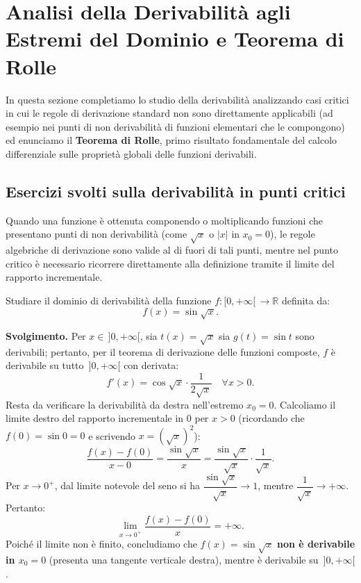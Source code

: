 \section{Analisi della Derivabilità agli Estremi del Dominio e Teorema di Rolle}

In questa sezione completiamo lo studio della derivabilità analizzando casi critici in cui le regole di derivazione standard non sono direttamente applicabili (ad esempio nei punti di non derivabilità di funzioni elementari che le compongono) ed enunciamo il \textbf{Teorema di Rolle}, primo risultato fondamentale del calcolo differenziale sulle proprietà globali delle funzioni derivabili.

\subsection{Esercizi svolti sulla derivabilità in punti critici}

Quando una funzione è ottenuta componendo o moltiplicando funzioni che presentano punti di non derivabilità (come $\sqrt{x}$ o $|x|$ in $x_0 = 0$), le regole algebriche di derivazione sono valide al di fuori di tali punti, mentre nel punto critico è necessario ricorrere direttamente alla definizione tramite il limite del rapporto incrementale.

\begin{esbox}[Esercizio svolto — Derivabilità di $f(x) = \sin\sqrt{x}$]
Studiare il dominio di derivabilità della funzione $f \colon [0, +\infty[\, \to \mathbb{R}$ definita da:
\[
    f(x) = \sin\sqrt{x}.
\]

\medskip
\noindent\textbf{Svolgimento.}
Per $x \in \,]0, +\infty[$, sia $t(x) = \sqrt{x}$ sia $g(t) = \sin t$ sono derivabili; pertanto, per il teorema di derivazione delle funzioni composte, $f$ è derivabile su tutto $\,]0, +\infty[$ con derivata:
\[
    f'(x) = \cos\sqrt{x} \cdot \frac{1}{2\sqrt{x}} \quad \forall x > 0.
\]
Resta da verificare la derivabilità da destra nell'estremo $x_0 = 0$. Calcoliamo il limite destro del rapporto incrementale in $0$ per $x > 0$ (ricordando che $f(0) = \sin 0 = 0$ e scrivendo $x = (\sqrt{x})^2$):
\[
    \frac{f(x) - f(0)}{x - 0} = \frac{\sin\sqrt{x}}{x} = \frac{\sin\sqrt{x}}{\sqrt{x}} \cdot \frac{1}{\sqrt{x}}.
\]
Per $x \to 0^+$, dal limite notevole del seno si ha $\dfrac{\sin\sqrt{x}}{\sqrt{x}} \to 1$, mentre $\dfrac{1}{\sqrt{x}} \to +\infty$. Pertanto:
\[
    \lim_{x \to 0^+} \frac{f(x) - f(0)}{x} = +\infty.
\]
Poiché il limite non è finito, concludiamo che $f(x) = \sin\sqrt{x}$ \textbf{non è derivabile in $x_0 = 0$} (presenta una tangente verticale destra), mentre è derivabile su $\,]0, +\infty[$.
\end{esbox}

